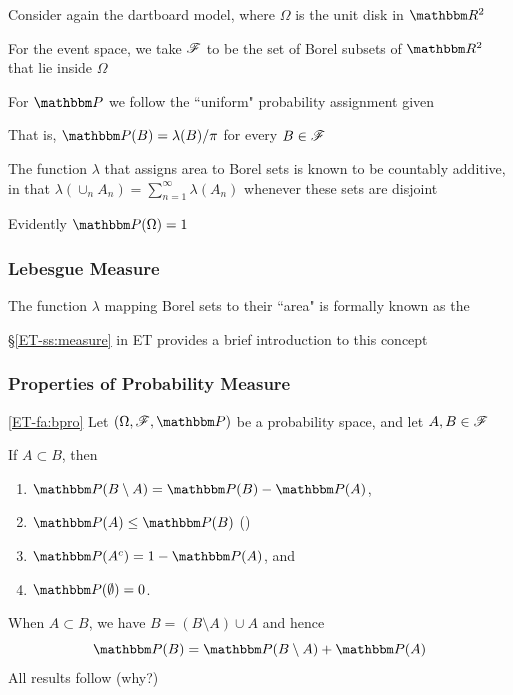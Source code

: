 \begin{frame}

    \vspace{2em}
    \Eg     Consider again the dartboard model, where
    $\Omega$ is the unit disk in $\RR^2$
    
    For the event space, we take $\mathscr F$ to be
    the set of Borel subsets of $\RR^2$ that lie inside $\Omega$
    
    For $\PP$ we
    follow the ``uniform" probability assignment given
    
    That is, $\PP(B) = \lambda(B) / \pi$ for every $B \in \mathscr F$
    
    The
    function $\lambda$ that assigns area to Borel sets is known to be
    countably additive, in that $\lambda(\cup_n A_n) = \sum_{n=1}^\infty
    \lambda(A_n)$ whenever these sets are disjoint 
    
    Evidently $\PP(\Omega) = 1$

\end{frame}

\begin{frame}\frametitle{Lebesgue Measure}

        \vspace{2em}
    The function $\lambda$ mapping Borel sets to
    their ``area" is formally known as the 
    
    \S\ref{ET-ss:measure} in ET provides a brief introduction to this concept
    
\end{frame}

\begin{frame}\frametitle{Properties of Probability Measure}
    
    \vspace{2em}
    \Fact\eqref{ET-fa:bpro}
    Let $(\Omega, \fF, \PP)$ be a probability space,  and let $A, B \in \mathscr F$\
    
    If $A \subset B$, then
    \begin{enumerate}
        \item $\PP(B \setminus A) = \PP(B) - \PP(A)$,
        \item $\PP(A) \leq \PP(B)$ ()
        \item $\PP(A^c) = 1 - \PP(A)$, and
        \item $\PP(\emptyset) = 0$.
    \end{enumerate}
     
    \Prf
    When $A \subset B$, we have $B = (B \setminus A) \cup A$ and hence
    \begin{equation*}
        \PP(B) = \PP(B \setminus A) + \PP(A)
    \end{equation*}
    All results follow (why?)
    
\end{frame}
    
